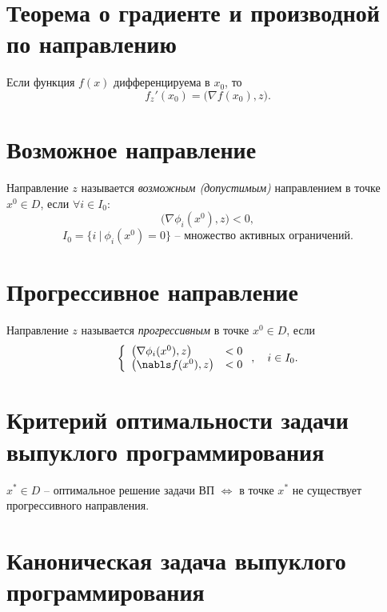 \section{Теорема о градиенте и производной по направлению}

\begin{theorem}
	Если функция $f(x)$ дифференцируема в $x_0$, то
	\[
		f_{z}'(x_0) = \big(\nabla f(x_0),z\big).
	\]
\end{theorem}

\section{Возможное направление}

\begin{definition}
	Направление $z$ называется \emph{возможным (допустимым)} направлением в точке $x^0 \in D$, если $\forall i \in I_0:$
	\[
		\big(\nabla \phi_i(x^0),z\big) < 0,
	\]
	\[
		I_0 = \big\{i \ | \ \phi_i(x^0) = 0\big\} \text{ -- множество активных ограничений}.
	\]
\end{definition}

\section{Прогрессивное направление}

\begin{definition}
	Направление $z$ называется \emph{прогрессивным} в точке $x^0 \in D$, если
	\[
		\left\{\begin{array}{ll}
			\big(\nabla \phi_i(x^0),z\big) & < 0 \\
			\big(\nabls f(x^0),z\big)      & < 0
		\end{array}\right., \quad i \in I_0.
	\]
\end{definition}

\section{Критерий оптимальности задачи выпуклого программирования}

\begin{theorem}
	$x^* \in D$ -- оптимальное решение задачи ВП $\iff $ в точке $x^*$ не существует прогрессивного направления.
\end{theorem}

\section{Каноническая задача выпуклого программирования}

